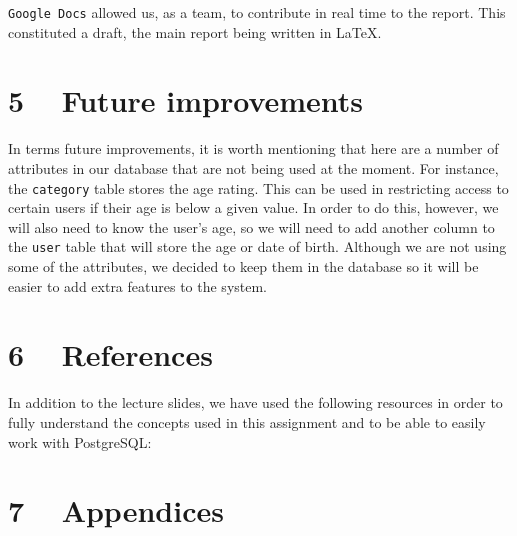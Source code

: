 \documentclass{article}
\begin{document}
\par {\texttt{Google Docs} allowed us, as a team, to contribute in real time to the report. This constituted a draft, the main report being written in \LaTeX.}


\section{5 ~  Future improvements}
\par {}
\par {In terms future improvements, it is worth mentioning that here are a number of attributes in our database that are not being used at the moment. For instance, the \texttt{category} table stores the age rating. This can be used in restricting access to certain users if their age is below a given value. In order to do this, however, we will also need to know the user's age, so we will need to add another column to the \texttt{user} table that will store the age or date of birth. Although we are not using some of the attributes, we decided to keep them in the database so it will be easier to add extra features to the system. }


\section{6 ~ References}
In addition to the lecture slides, we have used the following resources in order to fully understand the concepts used in this assignment and to be able to easily work with PostgreSQL:
\nocite{link4, link5, link6, db}


\vspace{15pt}

\section{7 ~ Appendices}
\appendix
\end{document}
